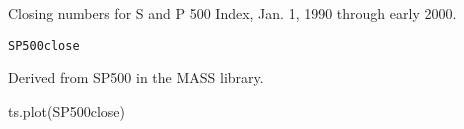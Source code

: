 \begin{Description}\relax
Closing numbers for S and P 500 Index, Jan. 1, 1990 through
early 2000.
\end{Description}
\begin{Usage}
\begin{verbatim}SP500close\end{verbatim}
\end{Usage}
\begin{Source}\relax
Derived from SP500 in the MASS library.
\end{Source}
\begin{Examples}
\begin{ExampleCode}
ts.plot(SP500close)
\end{ExampleCode}
\end{Examples}

